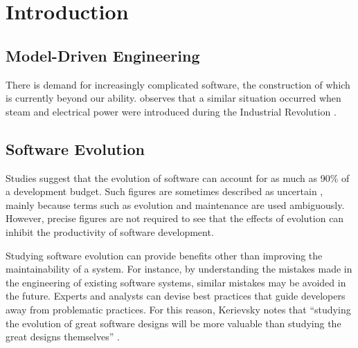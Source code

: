 
\chapter{Introduction}
\label{Introduction}

\section{Model-Driven Engineering}

There is demand for increasingly complicated software, the construction of which is currently beyond our ability. \cite{selic03pragmatics} observes that a similar situation occurred when steam and electrical power were introduced during the Industrial Revolution \cite{pool97society}. 

\section{Software Evolution}

Studies \cite{erlikh00leveraging,moad90maintaining} suggest that the evolution of software can account for as much as 90\% of a development budget. Such figures are sometimes described as uncertain \cite[ch. 21]{sommerville06software}, mainly because terms such as evolution and maintenance are used ambiguously. However, precise figures are not required to see that the effects of evolution can inhibit the productivity of software development. %

Studying software evolution can provide benefits other than improving the maintainability of a system. For instance, by understanding the mistakes made in the engineering of existing software systems, similar mistakes may be avoided in the future. Experts and analysts can devise best practices that guide developers away from problematic practices. For this reason, Kerievsky notes that ``studying the evolution of great software designs will be more valuable than studying the great designs themselves'' \cite{kerievsky04refactoring}.

